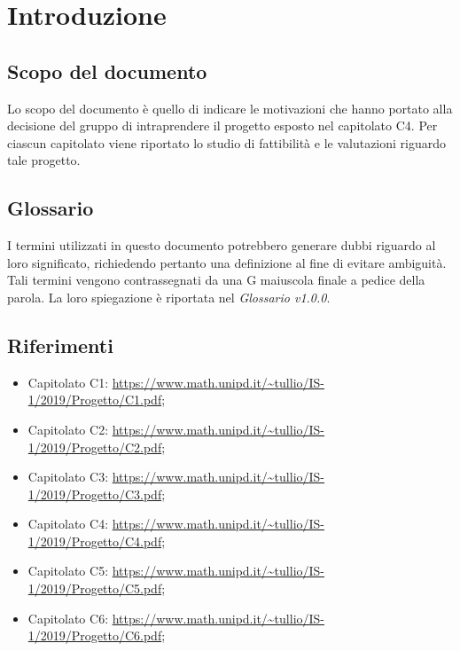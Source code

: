 \section{Introduzione}

\subsection{Scopo del documento}
Lo scopo del documento è quello di indicare le motivazioni che hanno portato alla decisione del gruppo di intraprendere il progetto esposto nel capitolato C4. Per ciascun capitolato viene riportato lo studio di fattibilità e le valutazioni riguardo tale progetto.

\subsection{Glossario}
I termini utilizzati in questo documento potrebbero generare dubbi riguardo al loro significato, richiedendo pertanto una definizione al fine di evitare ambiguità. Tali termini vengono contrassegnati da una G maiuscola finale a pedice della parola. La loro spiegazione è riportata nel \textit{Glossario v1.0.0}.

\subsection{Riferimenti}
\begin{itemize}
\item Capitolato C1: \url{https://www.math.unipd.it/~tullio/IS-1/2019/Progetto/C1.pdf};
\item Capitolato C2: \url{https://www.math.unipd.it/~tullio/IS-1/2019/Progetto/C2.pdf};
\item Capitolato C3: \url{https://www.math.unipd.it/~tullio/IS-1/2019/Progetto/C3.pdf};
\item Capitolato C4: \url{https://www.math.unipd.it/~tullio/IS-1/2019/Progetto/C4.pdf};
\item Capitolato C5: \url{https://www.math.unipd.it/~tullio/IS-1/2019/Progetto/C5.pdf};
\item Capitolato C6: \url{https://www.math.unipd.it/~tullio/IS-1/2019/Progetto/C6.pdf};
\end{itemize}